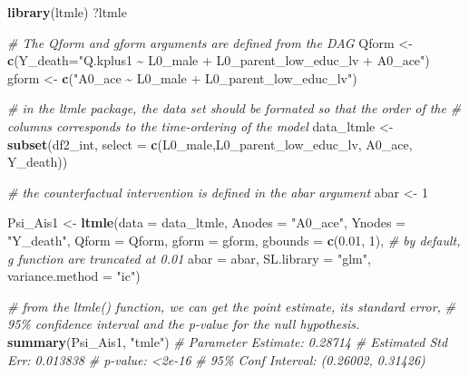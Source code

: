 \documentclass[
]{book}
\newenvironment{Shaded}{\begin{snugshade}}{\end{snugshade}}
\newcommand{\AttributeTok}[1]{\textcolor[rgb]{0.13,0.29,0.53}{#1}}
\newcommand{\CommentTok}[1]{\textcolor[rgb]{0.56,0.35,0.01}{\textit{#1}}}
\newcommand{\DecValTok}[1]{\textcolor[rgb]{0.00,0.00,0.81}{#1}}
\newcommand{\FloatTok}[1]{\textcolor[rgb]{0.00,0.00,0.81}{#1}}
\newcommand{\FunctionTok}[1]{\textcolor[rgb]{0.13,0.29,0.53}{\textbf{#1}}}
\newcommand{\NormalTok}[1]{#1}
\newcommand{\OtherTok}[1]{\textcolor[rgb]{0.56,0.35,0.01}{#1}}
\newcommand{\StringTok}[1]{\textcolor[rgb]{0.31,0.60,0.02}{#1}}
\begin{document}
\begin{Shaded}
\begin{Highlighting}[]
\FunctionTok{library}\NormalTok{(ltmle)}
\NormalTok{?ltmle}

\CommentTok{\# The Qform and gform arguments are defined from the DAG}
\NormalTok{Qform }\OtherTok{\textless{}{-}} \FunctionTok{c}\NormalTok{(}\AttributeTok{Y\_death=}\StringTok{"Q.kplus1 \textasciitilde{} L0\_male + L0\_parent\_low\_educ\_lv + A0\_ace"}\NormalTok{)}
\NormalTok{gform }\OtherTok{\textless{}{-}} \FunctionTok{c}\NormalTok{(}\StringTok{"A0\_ace \textasciitilde{} L0\_male + L0\_parent\_low\_educ\_lv"}\NormalTok{)}

\CommentTok{\# in the ltmle package, the data set should be formated so that the order of the }
\CommentTok{\# columns corresponds to the time{-}ordering of the model}
\NormalTok{data\_ltmle }\OtherTok{\textless{}{-}} \FunctionTok{subset}\NormalTok{(df2\_int, }\AttributeTok{select =} \FunctionTok{c}\NormalTok{(L0\_male,L0\_parent\_low\_educ\_lv,}
\NormalTok{                                         A0\_ace,}
\NormalTok{                                         Y\_death))}

\CommentTok{\# the counterfactual intervention is defined in the abar argument}
\NormalTok{abar }\OtherTok{\textless{}{-}} \DecValTok{1}

\NormalTok{Psi\_Ais1 }\OtherTok{\textless{}{-}} \FunctionTok{ltmle}\NormalTok{(}\AttributeTok{data =}\NormalTok{ data\_ltmle,}
                  \AttributeTok{Anodes =} \StringTok{"A0\_ace"}\NormalTok{,}
                  \AttributeTok{Ynodes =} \StringTok{"Y\_death"}\NormalTok{,}
                  \AttributeTok{Qform =}\NormalTok{ Qform,}
                  \AttributeTok{gform =}\NormalTok{ gform,}
                  \AttributeTok{gbounds =} \FunctionTok{c}\NormalTok{(}\FloatTok{0.01}\NormalTok{, }\DecValTok{1}\NormalTok{), }\CommentTok{\# by default, g function are truncated at 0.01}
                  \AttributeTok{abar =}\NormalTok{ abar,}
                  \AttributeTok{SL.library =} \StringTok{"glm"}\NormalTok{,}
                  \AttributeTok{variance.method =} \StringTok{"ic"}\NormalTok{)}

\CommentTok{\# from the ltmle() function, we can get the point estimate, its standard error, }
\CommentTok{\# 95\% confidence interval and the p{-}value for the null hypothesis.}
\FunctionTok{summary}\NormalTok{(Psi\_Ais1, }\StringTok{"tmle"}\NormalTok{)}
\CommentTok{\# Parameter Estimate:  0.28714}
\CommentTok{\#  Estimated Std Err:  0.013838}
\CommentTok{\#            p{-}value:  \textless{}2e{-}16}
\CommentTok{\#  95\% Conf Interval: (0.26002, 0.31426)}


\end{Highlighting}
\end{Shaded}
\end{document}

